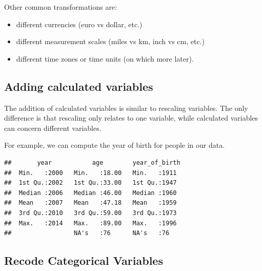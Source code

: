 \documentclass[]{tufte-book}
\newenvironment{Shaded}{}{}
\newcommand{\DataTypeTok}[1]{\textcolor[rgb]{0.56,0.13,0.00}{#1}}
\newcommand{\KeywordTok}[1]{\textcolor[rgb]{0.00,0.44,0.13}{\textbf{#1}}}
\newcommand{\NormalTok}[1]{#1}
\newcommand{\OperatorTok}[1]{\textcolor[rgb]{0.40,0.40,0.40}{#1}}
\newcommand{\StringTok}[1]{\textcolor[rgb]{0.25,0.44,0.63}{#1}}
\providecommand{\tightlist}{%
  \setlength{\itemsep}{0pt}\setlength{\parskip}{0pt}}
\begin{document}
Other common transformations are:

\begin{itemize}
\tightlist
\item
  different currencies (euro vs dollar, etc.)
\item
  different measurement scales (miles vs km, inch vs cm, etc.)
\item
  different time zones or time units (on which more later).
\end{itemize}

\hypertarget{adding-calculated-variables}{%
\subsection{Adding calculated variables}\label{adding-calculated-variables}}

The addition of calculated variables is similar to rescaling variables. The only difference is that rescaling only relates to one variable, while calculated variables can concern different variables.

For example, we can compute the year of birth for people in our data.

\begin{Shaded}
\end{Shaded}

\begin{verbatim}
##       year           age        year_of_birth 
##  Min.   :2000   Min.   :18.00   Min.   :1911  
##  1st Qu.:2002   1st Qu.:33.00   1st Qu.:1947  
##  Median :2006   Median :46.00   Median :1960  
##  Mean   :2007   Mean   :47.18   Mean   :1959  
##  3rd Qu.:2010   3rd Qu.:59.00   3rd Qu.:1973  
##  Max.   :2014   Max.   :89.00   Max.   :1996  
##                 NA's   :76      NA's   :76
\end{verbatim}

\hypertarget{recode-categorical-variables-1}{%
\subsection{Recode Categorical Variables}\label{recode-categorical-variables-1}}
\end{document}

